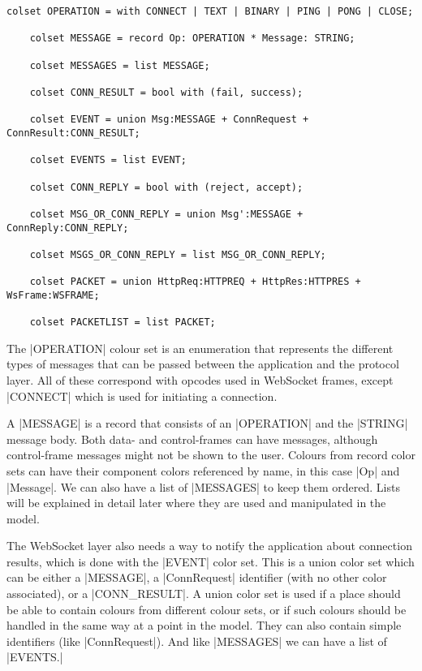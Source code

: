 	\begin{lstlisting}[label=lst:overview_colset,caption=Overview colour
	sets,gobble=1]
	colset OPERATION = with CONNECT | TEXT | BINARY | PING | PONG | CLOSE;
		
	colset MESSAGE = record Op: OPERATION *	Message: STRING;
	
	colset MESSAGES = list MESSAGE;
	
	colset CONN_RESULT = bool with (fail, success);
	
	colset EVENT = union Msg:MESSAGE + ConnRequest + ConnResult:CONN_RESULT;
	
	colset EVENTS = list EVENT;
	
	colset CONN_REPLY = bool with (reject, accept);
	
	colset MSG_OR_CONN_REPLY = union Msg':MESSAGE + ConnReply:CONN_REPLY;
	
	colset MSGS_OR_CONN_REPLY = list MSG_OR_CONN_REPLY;
	
	colset PACKET = union HttpReq:HTTPREQ + HttpRes:HTTPRES + WsFrame:WSFRAME;
	
	colset PACKETLIST = list PACKET;
	\end{lstlisting}
	
	The |OPERATION| colour set is an enumeration that represents the
	different types of messages that can be passed between the application and the
	protocol layer. All of these correspond with opcodes
	used in WebSocket frames, except |CONNECT| which is used for
	initiating a connection.
	
	A |MESSAGE| is a record that consists of an
	|OPERATION| and the |STRING| message body. Both
	data- and control-frames can have messages, although control-frame
	messages might not be shown to the user. Colours from record color sets can
	have their component colors referenced by name, in this case |Op| and |Message|. We can also have a list of |MESSAGES| to keep them ordered. Lists will be explained in detail
	later where they are used and manipulated in the model.
	
	The WebSocket layer also needs a way to notify the application about connection
	results, which is done with the |EVENT| color set. This is a union
	color set which can be either a |MESSAGE|, a |ConnRequest|
	identifier (with no other color associated), or a |CONN_RESULT|. A
	union color set is used if a place should be able to contain colours from
	different colour sets, or if such colours should be handled in the same way at
	a point in the model. They can also contain simple identifiers (like
	|ConnRequest|). And like |MESSAGES| we can have a list of
	|EVENTS.|
	
